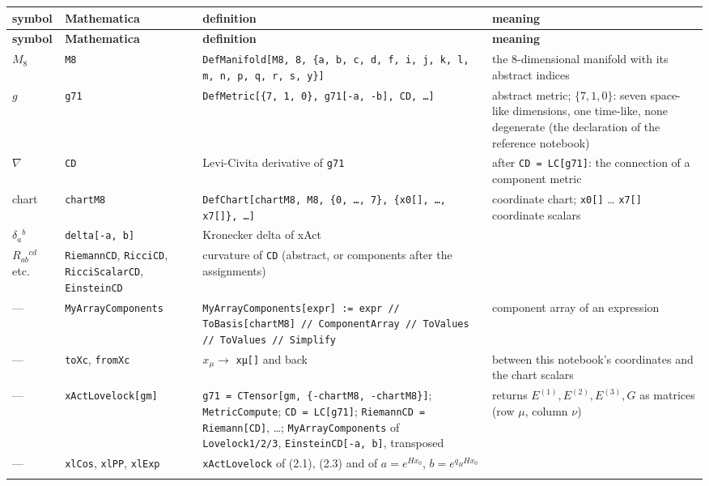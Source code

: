\documentclass[10pt,a4paper]{article}
\begin{document}
{\small
\begin{longtable}{>{\raggedright\arraybackslash}p{}>{\raggedright\arraybackslash}p{}>{\raggedright\arraybackslash}p{}>{\raggedright\arraybackslash}p{}}
\toprule
\textbf{symbol} & \textbf{Mathematica} & \textbf{definition} & \textbf{meaning} \\
\midrule\endfirsthead
\toprule
\textbf{symbol} & \textbf{Mathematica} & \textbf{definition} & \textbf{meaning} \\
\midrule\endhead
\endfoot
\bottomrule\endlastfoot
$M_8$ & \texttt{M8} & \texttt{DefManifold[M8, 8, \{a, b, c, d, f, i, j, k, l, m, n, p, q, r, s, y\}]} & the 8-dimensional manifold with its abstract indices \\
$g$ & \texttt{g71} & \texttt{DefMetric[\{7, 1, 0\}, g71[-a, -b], CD, …]} & abstract metric; $\{7,1,0\}$: seven space-like dimensions, one time-like, none degenerate (the declaration of the reference notebook) \\
$\nabla$ & \texttt{CD} & Levi-Civita derivative of \texttt{g71} & after \texttt{CD = LC[g71]}: the connection of a component metric \\
chart & \texttt{chartM8} & \texttt{DefChart[chartM8, M8, \{0, …, 7\}, \{x0[], …, x7[]\}, …]} & coordinate chart; \texttt{x0[]} … \texttt{x7[]} coordinate scalars \\
$\delta_a{}^b$ & \texttt{delta[-a, b]} & Kronecker delta of xAct &  \\
$R_{ab}{}^{cd}$ etc. & \texttt{RiemannCD}, \texttt{RicciCD}, \texttt{RicciScalarCD}, \texttt{EinsteinCD} & curvature of \texttt{CD} (abstract, or components after the assignments) &  \\
— & \texttt{MyArrayComponents} & \texttt{MyArrayComponents[expr] := expr /\allowbreak{}/\allowbreak{} ToBasis[chartM8] /\allowbreak{}/\allowbreak{} ComponentArray /\allowbreak{}/\allowbreak{} ToValues /\allowbreak{}/\allowbreak{} ToValues /\allowbreak{}/\allowbreak{} Simplify} & component array of an expression \\
— & \texttt{toXc}, \texttt{fromXc} & $x_\mu\to$ \texttt{xμ[]} and back & between this notebook’s coordinates and the chart scalars \\
— & \texttt{xActLovelock[gm]} & \texttt{g71 = CTensor[gm, \{-chartM8, -chartM8\}]}; \texttt{MetricCompute}; \texttt{CD = LC[g71]}; \texttt{RiemannCD = Riemann[CD]}, …; \texttt{MyArrayComponents} of \texttt{Lovelock1/\allowbreak{}2/\allowbreak{}3}, \texttt{EinsteinCD[-a, b]}, transposed & returns $E^{(1)},E^{(2)},E^{(3)},G$ as matrices (row $\mu$, column $\nu$) \\
— & \texttt{xlCos}, \texttt{xlPP}, \texttt{xlExp} & \texttt{xActLovelock} of (2.1), (2.3) and of $a=e^{Hx_0}$, $b=e^{q_HHx_0}$ &  \\*
\end{longtable}}
\end{document}
